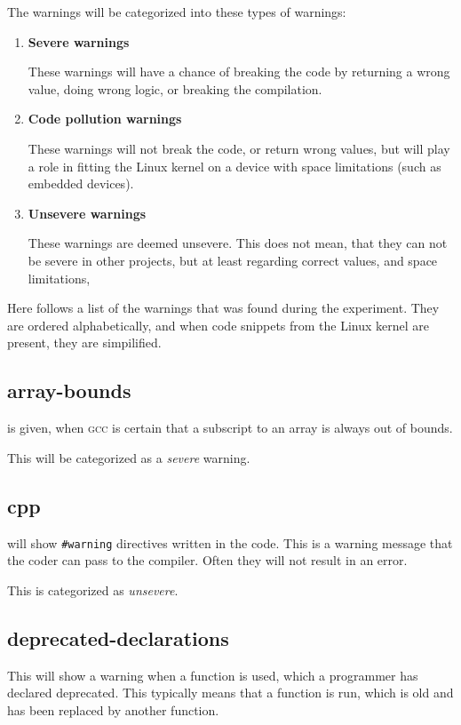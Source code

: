 \documentclass[a4paper,11pt]{report}
\newcommand{\textcode}[1]{
    \fboxsep=1pt
    \texttt{\colorbox{gray!20}{#1}}
}
\newcommand{\figa}{
    \begin{figure}[!htpb]
    \centering
}
\newcommand{\figb}[2]{
    \caption{#1}
    \label{#2}
    \end{figure}
}
\begin{document}
The warnings will be categorized into these types of warnings:

\begin{enumerate}
    \item \textbf{Severe warnings}

These warnings will have a chance of breaking the code by returning a wrong
value, doing wrong logic, or breaking the compilation.

    \item \textbf{Code pollution warnings}

These warnings will not break the code, or return wrong values, but will play a 
role in fitting the Linux kernel on a device with space limitations (such as 
embedded devices).

    \item \textbf{Unsevere warnings}

These warnings are deemed unsevere. This does not mean, that they can not be 
severe in other projects, but at least regarding correct values, and space 
limitations, 

\end{enumerate}


Here follows a list of the warnings that was found during the experiment.
They are ordered alphabetically, and when code snippets from the Linux kernel 
are present, they are simpilified.


            \subsection*{array-bounds}
is given, when \textsc{gcc} is certain that a subscript to an array is always 
out of bounds.

This will be categorized as a \emph{severe} warning.




            \subsection*{cpp}
will show \textcode{\#warning} directives written in the code. This is a warning
message that the coder can pass to the compiler. Often they will not result in 
an error.

This is categorized as \emph{unsevere}.


            \subsection*{deprecated-declarations}
This will show a warning when a function is used, which a programmer has 
declared deprecated. This typically means that a function is run, which is old
and has been replaced by another function.
\end{document}
